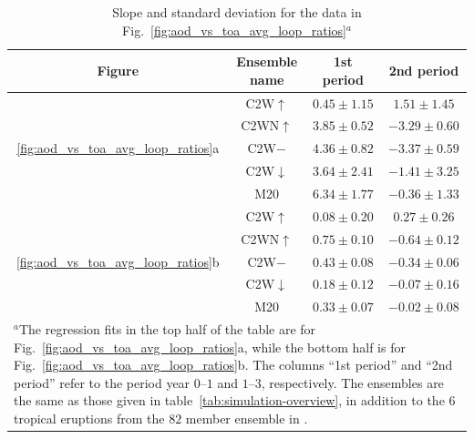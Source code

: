 \documentclass[draft]{agujournal2019}
\newcommand{\cwmp}{C2W\(-\)}
\newcommand{\cwm}{C2W\(\downarrow\)}
\newcommand{\cws}{C2WN\(\uparrow\)}
\newcommand{\cwsn}{C2W\(\uparrow\)}
\begin{document}
\begin{table}
  \centering

  \caption{Slope and standard deviation for the data in
    Fig.~\ref{fig:aod_vs_toa_avg_loop_ratios}\(^{a}\)}\label{tab:slope-gradients}%
  \begin{tabular}{cccc}
    \toprule
    Figure                                & Ensemble name & 1st period      & 2nd period       \\
    \midrule
                                          & \cwsn{}       & \(0.45\pm1.15\) & \(1.51\pm1.45\)  \\
                                          & \cws{}        & \(3.85\pm0.52\) & \(-3.29\pm0.60\) \\
    \ref{fig:aod_vs_toa_avg_loop_ratios}a & \cwmp{}       & \(4.36\pm0.82\) & \(-3.37\pm0.59\) \\
                                          & \cwm{}        & \(3.64\pm2.41\) & \(-1.41\pm3.25\) \\
                                          & M20           & \(6.34\pm1.77\) & \(-0.36\pm1.33\) \\
    \midrule
                                          & \cwsn{}       & \(0.08\pm0.20\) & \(0.27\pm0.26\)  \\
                                          & \cws{}        & \(0.75\pm0.10\) & \(-0.64\pm0.12\) \\
    \ref{fig:aod_vs_toa_avg_loop_ratios}b & \cwmp{}       & \(0.43\pm0.08\) & \(-0.34\pm0.06\) \\
                                          & \cwm{}        & \(0.18\pm0.12\) & \(-0.07\pm0.16\) \\
                                          & M20           & \(0.33\pm0.07\) & \(-0.02\pm0.08\) \\
    \toprule
    \multicolumn{4}{l}{\parbox{\linewidth}{\(^{a}\)The regression fits in the top half of the
        table are for Fig.~\ref{fig:aod_vs_toa_avg_loop_ratios}a, while the bottom half is for
        Fig.~\ref{fig:aod_vs_toa_avg_loop_ratios}b. The columns ``1st period'' and ``2nd
        period'' refer to the period year \(0\)--\(1\) and \(1\)--\(3\), respectively. The
        ensembles are the same as those given in table~\ref{tab:simulation-overview}, in
        addition to the \(6\) tropical eruptions from the \(82\) member ensemble in
    .}}                                                                    \\
  \end{tabular}
\end{table}
\end{document}
